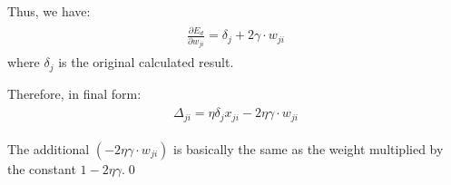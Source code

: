 \documentclass[preview]{standalone}
\begin{document}
Thus, we have:
\begin{align}
\begin{split}
\frac{\partial E_d}{\partial w_{ji}}
= \delta_j + 2 \gamma \cdot w_{ji}
\end{split}
\end{align}
where $\delta_j$ is the original calculated result.

Therefore, in final form:
\begin{align}
\begin{split}
    \Delta _{ji} = \eta\delta_jx_{ji} - 2\eta\gamma \cdot w_{ji}
\end{split}
\end{align}

The additional $(-2\eta\gamma \cdot w_{ji})$ is basically the same as the
weight multiplied by the constant $1 - 2\eta\gamma$.\qed
\end{document}

